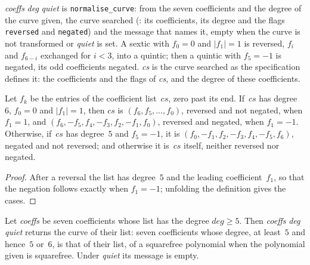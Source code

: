 \begin{definition}\label{def:normalizeCurve}
  \leanok
   \textit{coeffs} \textit{deg} \textit{quiet} is
  \texttt{normalise\_curve}: from the seven coefficients and the degree of the curve given, the
  curve searched (: its coefficients, its degree and the flags
  \texttt{reversed} and \texttt{negated}) and the message that names it, empty when the curve is
  not transformed or \textit{quiet} is set. A sextic with $f_0 = 0$ and $|f_1| = 1$ is reversed,
  $f_i$ and $f_{6-i}$ exchanged for $i < 3$, into a quintic; then a quintic with $f_5 = -1$ is
  negated, its odd coefficients negated.  \textit{cs} is the curve
  searched as the specification defines it: the coefficients and the flags of
   \textit{cs}, and the degree of these coefficients.
\end{definition}

\begin{lemma}\label{lem:searchedCoeffs_eq}
  \leanok
  Let $f_k$ be the entries of the coefficient list~$cs$, zero past its end. If~$cs$ has degree~$6$,
  $f_0 = 0$ and $|f_1| = 1$, then  $cs$ is
  $(f_6, f_5, \dots, f_0)$, reversed and not negated, when $f_1 = 1$, and
  $(f_6, -f_5, f_4, -f_3, f_2, -f_1, f_0)$, reversed and negated, when $f_1 = -1$. Otherwise,
  if~$cs$ has degree~$5$ and $f_5 = -1$, it is $(f_0, -f_1, f_2, -f_3, f_4, -f_5, f_6)$, negated
  and not reversed; and otherwise it is~$cs$ itself, neither reversed nor negated.
\end{lemma}

\begin{proof}
  \leanok
  After a reversal the list has degree~$5$ and the leading coefficient~$f_1$, so that the negation
  follows exactly when $f_1 = -1$; unfolding the definition gives the cases.
\end{proof}

\begin{lemma}\label{lem:normalizeCurve_spec}
  \leanok
  Let \textit{coeffs} be seven coefficients whose list has the degree $\mathit{deg} \ge 5$. Then
   \textit{coeffs} \textit{deg} \textit{quiet} returns the curve
   of their list: seven coefficients whose degree, at least~$5$ and
  hence~$5$ or~$6$, is that of their list, of a squarefree polynomial when the polynomial given is
  squarefree. Under \textit{quiet} its message is empty.
\end{lemma}

